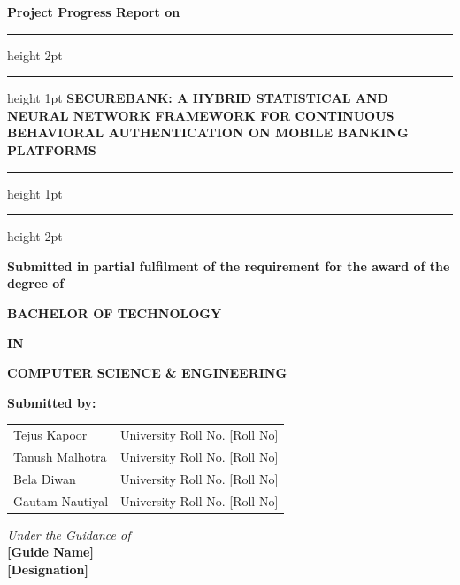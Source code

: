 \documentclass[12pt,a4paper]{report}
\begin{document}
\begin{titlepage}
\begin{center}
\textbf{\Large Project Progress Report on}

\vspace{0.3cm}
\hrule height 2pt
\vspace{0.15cm}
\hrule height 1pt
\vspace{0.5cm}
\textbf{\Large SECUREBANK: A HYBRID STATISTICAL AND NEURAL NETWORK FRAMEWORK FOR CONTINUOUS BEHAVIORAL AUTHENTICATION ON MOBILE BANKING PLATFORMS}
\vspace{0.4cm}
\hrule height 1pt
\vspace{0.15cm}
\hrule height 2pt

\vspace{0.8cm}
\textbf{Submitted in partial fulfilment of the requirement for the award of the degree of}

\vspace{0.6cm}
\textbf{BACHELOR OF TECHNOLOGY}

\vspace{0.3cm}
\textbf{IN}

\vspace{0.3cm}
\textbf{COMPUTER SCIENCE \& ENGINEERING}

\vspace{0.5cm}
\textbf{Submitted by:}
\end{center}

\vspace{0.2cm}
\begin{table}[h]
\centering
\bfseries
\renewcommand{\arraystretch}{1.5}
\begin{tabular}{ll}
Tejus Kapoor     & University Roll No. [Roll No] \\
Tanush Malhotra  & University Roll No. [Roll No] \\
Bela Diwan       & University Roll No. [Roll No] \\
Gautam Nautiyal  & University Roll No. [Roll No] \\
\end{tabular}
\end{table}

\begin{center}
\vspace{0.5cm}
\textit{Under the Guidance of}\\
\textbf{[Guide Name]}\\
\textbf{[Designation]}


\end{center}
\end{titlepage}
\end{document}
